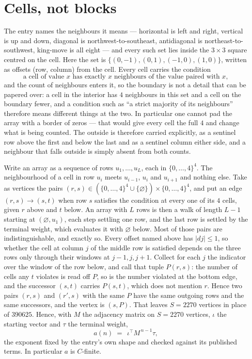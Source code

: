 \documentclass[11pt,a4paper]{article}
\theoremstyle{plain}
\theoremstyle{definition}
\begin{document}
\section{Cells, not blocks}

The entry names the neighbours it means --- horizontal is left and right, vertical is up and
down, diagonal is northwest-to-southeast, antidiagonal is northeast-to-southwest, king-move is
all eight --- and every such set lies inside the $3\times3$ square centred on the cell. Here
the set is $\{(0,-1), (0,1), (-1,0), (1,0)\}$, written as offsets (row, column) from the cell. Every cell carries
the condition
\[
\text{a cell of value }x\text{ has exactly }x\text{ neighbours of the value paired with }x,
\]
and the count of neighbours enters it, so the boundary is not a detail that can be papered
over: a cell in the interior has $4$ neighbours in this set and a cell on the boundary
fewer, and a condition such as ``a strict majority of its neighbours'' therefore means
different things at the two. In particular one cannot pad the array with a border of zeros ---
that would give every cell the full $4$ and change what is being counted. The outside is
therefore carried
explicitly, as a sentinel row above the first and below the last and as a sentinel column
either side, and a neighbour that falls outside is simply absent from both counts.

Write an array as a sequence of rows $u_1,\dots,u_L$, each in
$\{0,\dots,4\}^{4}$. The neighbourhood of a cell in row $u_i$ meets $u_{i-1}$,
$u_i$ and $u_{i+1}$ and nothing else. Take as vertices the pairs
$(r,s)\in(\{0,\dots,4\}^{4}\cup\{\varnothing\})\times\{0,\dots,4\}^{4}$,
and put an edge $(r,s)\to(s,t)$ when row $s$ satisfies the condition at every one of its
$4$ cells, given $r$ above and $t$ below. An array with $L$ rows is then a walk of length
$L-1$ starting at $(\varnothing,u_1)$, each step settling one row, and the last row is
settled by the terminal weight, which evaluates it with $\varnothing$ below. Most of those pairs are indistinguishable, and exactly so. Every offset named above has $|dj|\le 1$, so whether the cell at column $j$ of the middle row is satisfied depends on the three rows only through their windows at $j-1,j,j+1$. Collect for each $j$ the indicator over the window of the row below, and call that tuple $P(r,s)$: the number of cells any $t$ violates is read off $P$, so is the number violated at the bottom edge, and the successor $(s,t)$ carries $P(s,t)$, which does not mention $r$. Hence two pairs $(r,s)$ and $(r',s)$ with the same $P$ have the same outgoing rows and the same successors, and the vertex is $(s,P)$. That leaves $S=2270$ vertices in place of $390625$. Hence,
with $M$ the adjacency matrix on $S=2270$ vertices, $\iota$ the starting vector and $\tau$ the
terminal weight,
\[
a(n)\;=\;\,\iota^{\!\top}M^{\,n-1}\tau ,
\]
the exponent fixed by the entry's own shape and checked against its published terms. In
particular $a$ is $C$-finite.
\end{document}
